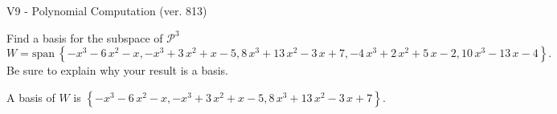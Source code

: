 \begin{exercise}
  \begin{exerciseTitle}V9 - Polynomial Computation (ver. 813)\end{exerciseTitle}
  \begin{exerciseStatement}
    Find a basis for the subspace of \(\mathcal{P}^3\) 
\[W=\mathrm{span}\ \left\{-x^{3} - 6 \, x^{2} - x , -x^{3} + 3 \, x^{2} + x - 5 , 8 \, x^{3} + 13 \, x^{2} - 3 \, x + 7 , -4 \, x^{3} + 2 \, x^{2} + 5 \, x - 2 , 10 \, x^{3} - 13 \, x - 4\right\}.\]
 Be sure to explain why your result is a basis.


  \end{exerciseStatement}
  \begin{exerciseAnswer}
   A basis of \(W\) is  \(\left\{-x^{3} - 6 \, x^{2} - x , -x^{3} + 3 \, x^{2} + x - 5 , 8 \, x^{3} + 13 \, x^{2} - 3 \, x + 7\right\}\).
  


  \end{exerciseAnswer}
\end{exercise}